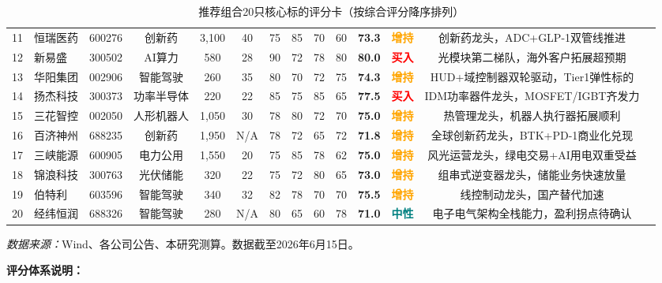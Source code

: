 \begin{table}[htbp]
\begin{tabular}{@{}clcccccccccccc@{}}
    11 & 恒瑞医药 & 600276 & 创新药 & 3,100 & 40 & 75 & 85 & 70 & 60 & \textbf{73.3} & \textcolor{orange}{\textbf{增持}} & 创新药龙头，ADC+GLP-1双管线推进 \\
    12 & 新易盛 & 300502 & AI算力 & 580 & 28 & 90 & 72 & 78 & 80 & \textbf{80.0} & \textcolor{red}{\textbf{买入}} & 光模块第二梯队，海外客户拓展超预期 \\
    13 & 华阳集团 & 002906 & 智能驾驶 & 260 & 35 & 80 & 70 & 72 & 75 & \textbf{74.3} & \textcolor{orange}{\textbf{增持}} & HUD+域控制器双轮驱动，Tier1弹性标的 \\
    14 & 扬杰科技 & 300373 & 功率半导体 & 220 & 22 & 85 & 75 & 85 & 65 & \textbf{77.5} & \textcolor{red}{\textbf{买入}} & IDM功率器件龙头，MOSFET/IGBT齐发力 \\
    15 & 三花智控 & 002050 & 人形机器人 & 1,050 & 30 & 78 & 80 & 72 & 70 & \textbf{75.0} & \textcolor{orange}{\textbf{增持}} & 热管理龙头，机器人执行器拓展顺利 \\
    16 & 百济神州 & 688235 & 创新药 & 1,950 & N/A & 78 & 72 & 65 & 72 & \textbf{71.8} & \textcolor{orange}{\textbf{增持}} & 全球创新药龙头，BTK+PD-1商业化兑现 \\
    17 & 三峡能源 & 600905 & 电力公用 & 1,550 & 20 & 75 & 85 & 78 & 62 & \textbf{75.0} & \textcolor{orange}{\textbf{增持}} & 风光运营龙头，绿电交易+AI用电双重受益 \\
    18 & 锦浪科技 & 300763 & 光伏储能 & 320 & 22 & 75 & 72 & 80 & 65 & \textbf{73.0} & \textcolor{orange}{\textbf{增持}} & 组串式逆变器龙头，储能业务快速放量 \\
    19 & 伯特利 & 603596 & 智能驾驶 & 340 & 32 & 82 & 78 & 70 & 70 & \textbf{75.5} & \textcolor{orange}{\textbf{增持}} & 线控制动龙头，国产替代加速 \\
    20 & 经纬恒润 & 688326 & 智能驾驶 & 280 & N/A & 80 & 65 & 60 & 78 & \textbf{71.0} & \textcolor{teal}{\textbf{中性}} & 电子电气架构全栈能力，盈利拐点待确认 \\
    \bottomrule
  \end{tabular}
  \vspace{0.4em}
  \caption{推荐组合20只核心标的评分卡（按综合评分降序排列）}
  \label{tab:portfolio_scorecard}
  \vspace{-0.5em}
  \footnotesize\textit{数据来源：}Wind、各公司公告、本研究测算。数据截至2026年6月15日。
  \vspace{0.3em}
  \begin{tcolorbox}[colback=gray!5, colframe=gray!30, boxrule=0.5pt,
      left=6pt, right=6pt, top=4pt, bottom=4pt]
    \textbf{\scriptsize 评分体系说明：}

\end{tcolorbox}
\end{table}
